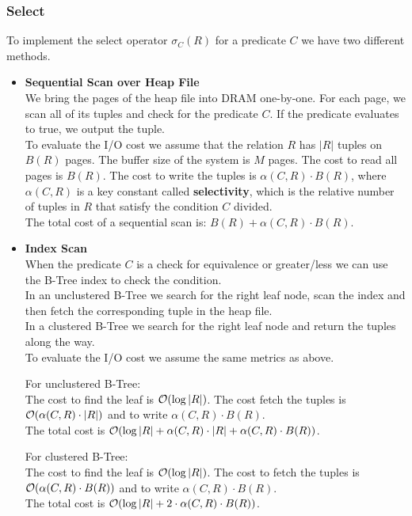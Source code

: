\subsubsection{Select}
To implement the select operator $\sigma_C(R)$ for a predicate $C$ we have two different methods. 
\begin{addmargin}{-.5cm}
\begin{itemize}
\item \textbf{Sequential Scan over Heap File}\\
We bring the pages of the heap file into DRAM one-by-one. For each page, we scan all of its tuples and check for the predicate $C$. If the predicate evaluates to true, we output the tuple.\\
To evaluate the I/O cost we assume that the relation $R$ has $|R|$ tuples on $B(R)$ pages. The buffer size of the system is $M$ pages. The cost to read all pages is $B(R)$. The cost to write the tuples is $\alpha(C, R)\cdot B(R)$, where $\alpha(C, R)$ is a key constant called \textbf{selectivity}, which is the relative number of tuples in $R$ that satisfy the condition $C$ divided.\\
The total cost of a sequential scan is: $B(R) + \alpha(C, R) \cdot B(R)$.
\item \textbf{Index Scan}\\
When the predicate $C$ is a check for equivalence or greater/less we can use the B-Tree index to check the condition.\\
In an unclustered B-Tree we search for the right leaf node, scan the index and then fetch the corresponding tuple in the heap file.\\
In a clustered B-Tree we search for the right leaf node and return the tuples along the way.\\
To evaluate the I/O cost we assume the same metrics as above.
\begin{tcolorbox}
\begin{minipage}[t]{.48\textwidth}
For unclustered B-Tree:\\
The cost to find the leaf is $\mathcal{O}(\log |R|)$. The cost fetch the tuples is $\mathcal{O} (\alpha(C, R) \cdot |R|)$ and to write $\alpha(C, R)\cdot B(R)$.\\
The total cost is $\mathcal{O}(\log |R| + \alpha(C, R) \cdot |R| + \alpha(C, R)\cdot B(R))$.
\end{minipage}
\begin{minipage}[t]{.04\textwidth}
\hfill
\end{minipage}
\begin{minipage}[t]{.48\textwidth}
For clustered B-Tree:\\
The cost to find the leaf is $\mathcal{O}(\log |R|)$. The cost to fetch the tuples is $\mathcal{O} (\alpha(C, R) \cdot B(R))$ and to write $\alpha(C,R)\cdot B(R)$.\\
The total cost is $\mathcal{O} (\log |R| + 2\cdot \alpha(C, R) \cdot B(R))$.
\end{minipage}
\end{tcolorbox}
\end{itemize}
\end{addmargin}
